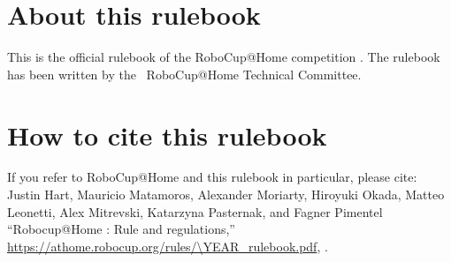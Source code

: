 


\section*{About this rulebook}
This is the official rulebook of the RoboCup@Home competition \YEAR.
The rulebook has been written by the \YEAR ~RoboCup@Home Technical Committee.



\section*{How to cite this rulebook}
If you refer to RoboCup@Home and this rulebook in particular, please cite:\\

\noindent Justin Hart, Mauricio Matamoros, Alexander Moriarty, Hiroyuki Okada,
Matteo Leonetti, Alex Mitrevski, Katarzyna Pasternak, and Fagner Pimentel
\enquote{Robocup@Home \YEAR: Rule and regulations,}
\url{https://athome.robocup.org/rules/\YEAR_rulebook.pdf}, \YEAR.

\begin{center}
	\begin{minipage}{0.8\textwidth}
		\footnotesize%
		
	\end{minipage}
\end{center}

